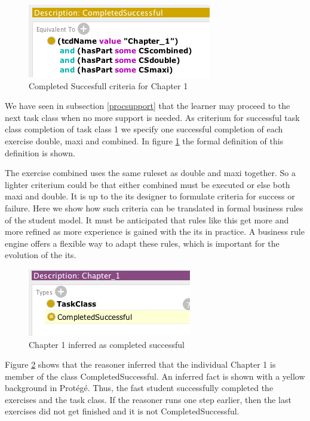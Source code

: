 \begin{figure}
\includegraphics[scale=0.7]{pictures/screen08.png}
\caption{Completed Succesfull criteria for Chapter 1}
\label{fig:onto05}
\end{figure}

We have seen in subsection \ref{procsupport} that the learner may proceed to the next task class when no more support is needed.
As criterium for successful task class completion of task class 1 we specify one successful completion of each exercise double, maxi and  combined.
In figure \ref{fig:onto05} the formal definition of this definition is shown. 

The exercise combined uses the same ruleset as double and maxi together. 
So a lighter criterium could be that either combined must be executed or else both maxi and double.
It is up to the \gls{its} designer to formulate criteria for success or failure.
Here we show how such criteria can be translated in formal business rules of the student model.
It must be anticipated that rules like this get more and more refined as more experience is gained with the \gls{its} in practice.
A business rule engine offers a flexible way to adapt these rules, which is important for the evolution of the \gls{its}.


\begin{figure}
\includegraphics[scale=0.7]{pictures/screen09.png}
\caption{Chapter 1 inferred as completed successful}
\label{fig:onto06}
\end{figure}

Figure \ref{fig:onto06} shows that the reasoner inferred that the individual Chapter 1 is member of the class CompletedSuccessful.
An inferred fact is shown with a yellow background in Prot\'eg\'e.
Thus, the fast student successfully completed the exercises and the task class.
If the reasoner runs one step earlier, then the last exercises did not get finished and it is not CompletedSuccessful.

